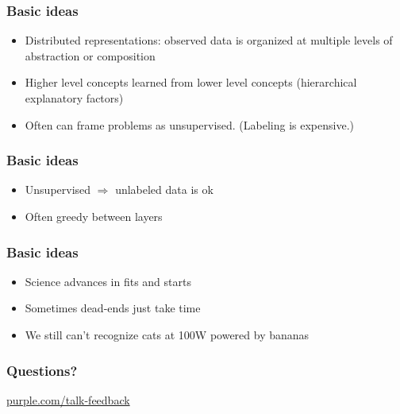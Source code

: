 \begin{frame}
  \frametitle{Basic ideas}
  \begin{itemize}
  \item Distributed representations: observed data is organized at
    multiple levels of abstraction or composition
  \item Higher level concepts learned from lower level concepts
    (hierarchical explanatory factors)
  \item Often can frame problems as unsupervised.  (Labeling is
    expensive.)
  \end{itemize}
  
\end{frame}

\begin{frame}
  \frametitle{Basic ideas}
  \begin{itemize}
  \item Unsupervised $\Rightarrow$ unlabeled data is ok
  \item Often greedy between layers
  \end{itemize}
\end{frame}

\begin{frame}
  \frametitle{Basic ideas}
  \begin{itemize}
  \item Science advances in fits and starts
  \item Sometimes dead-ends just take time
  \item We still can't recognize cats at 100W powered by bananas
  \end{itemize}
\end{frame}



\begin{frame}
  \frametitle{Questions?}
  \centerline{\large\url{purple.com/talk-feedback}}
\end{frame}


